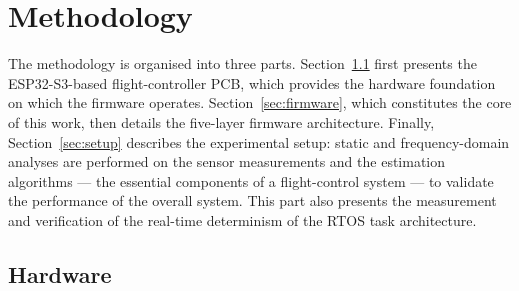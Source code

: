 \section{Methodology}

The methodology is organised into three parts. Section~\ref{sec:hardware} first presents the ESP32-S3-based flight-controller PCB, which provides the hardware foundation on which the firmware operates. Section~\ref{sec:firmware}, which constitutes the core of this work, then details the five-layer firmware architecture. Finally, Section~\ref{sec:setup} describes the experimental setup: static and frequency-domain analyses are performed on the sensor measurements and the estimation algorithms --- the essential components of a flight-control system --- to validate the performance of the overall system. This part also presents the measurement and verification of the real-time determinism of the RTOS task architecture.
\subsection{Hardware}
\label{sec:hardware}

